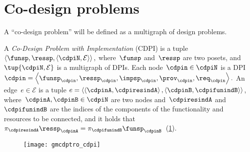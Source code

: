 \section{Co-design problems}
\label{sec:Co-design-problems}

A ``co-design problem'' will be defined as a multigraph of design
problems.
\begin{definition}
  \label{def:cdpi}
  A \emph{Co-Design Problem with Implementation} (CDPI)
  is a tuple $\left\langle \funsp,\ressp,\left\langle \cdpiN,\mathcal{E}\right\rangle \right\rangle ,$
  where~$\funsp$ and~$\ressp$ are two posets, and~$\tup{ \cdpiN,\mathcal{E}} $
  is a multigraph of DPIs. Each node~$\cdpin\in\cdpiN$ is a
  DPI $\cdpin=\left\langle \funsp_{\cdpin},\ressp_{\cdpin},\impsp_{\cdpin},\prov_{\cdpin},\req_{\cdpin}\right\rangle .$
  An edge~$e\in\mathcal{E}$ is a tuple $e=\left\langle \left\langle \cdpinA,\cdpiresindA\right\rangle ,\left\langle \cdpinB,\cdpifunindB\right\rangle \right\rangle $,
  where~$\cdpinA,\cdpinB\in\cdpiN$ are two nodes and~$\cdpiresindA$
  and~$\cdpifunindB$ are the indices of the components of the functionality
  and resources to be connected, and it holds that~$\pi_{\cdpiresindA}\ressp_{\cdpinA}=\pi_{\cdpifunindB}\funsp_{\cdpinB}$~(\cref{fig:mcdps}).

  \begin{figure}[h]
    \centering
    \texttt{[image: gmcdptro\_cdpi]}
    \caption{\label{fig:mcdps}}
  \end{figure}


\end{definition}

